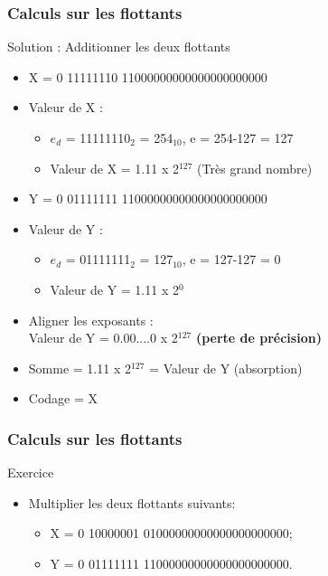 \documentclass{beamer}
\begin{document}
\begin{frame}
\frametitle{Calculs sur les flottants}

\begin{block}{Solution : Additionner les deux flottants}
\begin{itemize}
\item X = 0 11111110 11000000000000000000000
\item Valeur de X :
  \begin{itemize}
  \item $e_d$ = 11111110$_2$ = 254$_{10}$, e = 254-127 = 127
  \item Valeur de X = 1.11 x 2$^{127}$ (Très grand nombre)
  \end{itemize}
  
\item Y = 0 01111111 11000000000000000000000
  \item Valeur de Y :
  \begin{itemize}
  \item $e_d$ = 01111111$_2$ = 127$_{10}$, e = 127-127 = 0
  \item Valeur de Y = 1.11 x 2$^{0}$
  \end{itemize}
\item Aligner les exposants :\\ Valeur de Y = 0.00....0 x 2$^{127}$
  \textbf{(perte de précision)}
\item Somme = 1.11 x 2$^{127}$ = Valeur de Y (absorption)
\item Codage = X
\end{itemize}
\end{block}
\end{frame}

\begin{frame}
\frametitle{Calculs sur les flottants}

\begin{block}{Exercice}
\begin{itemize}
\item Multiplier les deux flottants suivants:
\begin{itemize}
\item X = 0 10000001 01000000000000000000000;
\item Y = 0 01111111 11000000000000000000000.
\end{itemize}
\end{itemize}
\end{block}
\end{frame}
\end{document}
